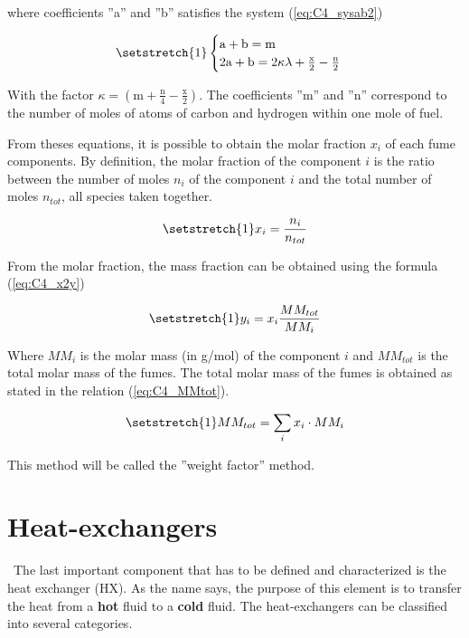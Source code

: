 where coefficients ''a'' and ''b'' satisfies the system (\ref{eq:C4_sysab2})

\begin{equation}
    \setstretch{1}
    \begin{cases}
        \text{a} + \text{b} = \text{m} \\
        2\text{a} + \text{b} = 2\kappa\lambda + \frac{\text{x}}{2} - \frac{\text{n}}{2}
    \end{cases}\label{eq:C4_sysab2}
\end{equation}

With the factor \(\kappa = (\text{m}+\frac{\text{n}}{4}-\frac{\text{x}}{2})\). The coefficients ''m'' and ''n'' correspond to the number of moles of atoms of carbon and hydrogen within one mole of fuel.

From theses equations, it is possible to obtain the molar fraction \(x_i\) of each fume components. By definition, the molar fraction of the component \(i\) is the ratio between the number of moles \(n_i\) of the component \(i\) and the total number of moles \(n_{tot}\), all species taken together.

\begin{equation*}
    \setstretch{1}
    x_i = \frac{n_i}{n_{tot}}
\end{equation*}

From the molar fraction, the mass fraction can be obtained using the formula (\ref{eq:C4_x2y})

\begin{equation}
    \setstretch{1}
    y_i = x_i\frac{MM_{tot}}{MM_i} \label{eq:C4_x2y}
\end{equation}

Where \(MM_i\) is the molar mass (in g/mol) of the component \(i\) and \(MM_{tot}\) is the total molar mass of the fumes. The total molar mass of the fumes is obtained as stated in the relation (\ref{eq:C4_MMtot}).

\begin{equation}
    \setstretch{1}
    MM_{tot} = \sum_i x_i\cdot MM_i \label{eq:C4_MMtot}
\end{equation}

This method will be called the ''weight factor'' method.

\section{Heat-exchangers}
\quad\ The last important component that has to be defined and characterized is the heat exchanger (HX). As the name says, the purpose of this element is to transfer the heat from a \textbf{hot} fluid to a \textbf{cold} fluid. The heat-exchangers can be classified into several categories\cite{Ngendakumana2018}.

